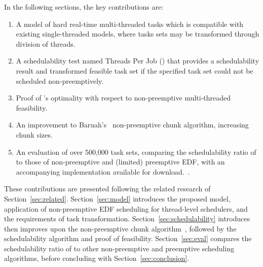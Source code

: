 In the following sections, the key contributions are:
\begin{enumerate}
  \item A model of hard real-time multi-threaded tasks which is
    compatible with existing single-threaded models, where tasks sets
    may be transformed through division of threads.
  \item A schedulability test named Threads Per Job (\tpj{}) that provides a
    schedulability result and transformed feasible task set if the
    specified task set could not be scheduled non-preemptively.
  \item Proof of \tpj{}'s optimality with respect to non-preemptive
    multi-threaded feasibility.
  \item An improvement to Baruah's~\cite{Baruah:2005}
    non-preemptive chunk algorithm, increasing chunk sizes.
  \item An evaluation of over 500,000 task sets, comparing the
    schedulability ratio of \tpj{} to those of non-preemptive and
    (limited) preemptive EDF, with an accompanying implementation available for
    download.~\cite{NPM-Artifact:2019}.
\end{enumerate}

These contributions are presented following the related
research of Section~\ref{sec:related}. Section~\ref{sec:model}
introduces the proposed model, application of non-preemptive EDF
scheduling for thread-level schedulers, and the requirements of task
transformation. Section~\ref{sec:schedulability} introduces then
improves upon the non-preemptive chunk algorithm~\cite{Baruah:2005},
followed by the \tpj{} schedulability algorithm and proof of
feasibility. Section~\ref{sec:eval} compares the schedulability ratio
of \tpj{} to other non-preemptive and preemptive scheduling
algorithms, before concluding with Section~\ref{sec:conclusion}. 

  

